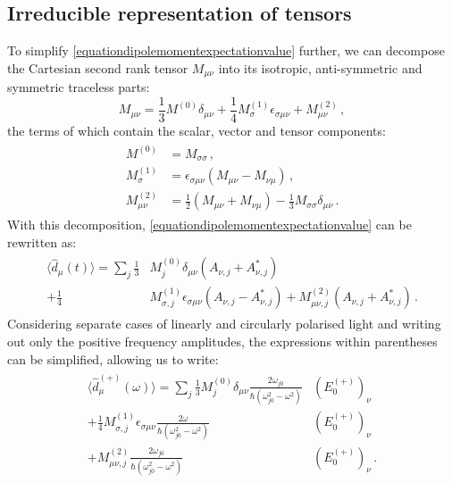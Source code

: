 \documentclass[../Thesis-IJspeert.tex]{subfiles}
\begin{document}
\subsection{Irreducible representation of tensors}
To simplify \autoref{equationdipolemomentexpectationvalue} further, we can decompose the Cartesian second rank tensor $M_{\mu\nu}$ into its isotropic, anti-symmetric and symmetric traceless parts:
\begin{equation}
\label{irreduciblerepcartesian}
	M_{\mu\nu}=\frac{1}{3}M^{(0)}\delta_{\mu\nu} + \frac{1}{4}M_{\sigma}^{(1)}\epsilon_{\sigma\mu\nu} + M_{\mu\nu}^{(2)} \,,
\end{equation}
the terms of which contain the scalar, vector and tensor components:
\begin{align}
\begin{split}
 M^{(0)} &= M_{\sigma\sigma} \,,\\
 M^{(1)}_\sigma &= \epsilon_{\sigma\mu\nu}(M_{\mu\nu}-M_{\nu\mu}) \,,\\
 M^{(2)}_{\mu\nu} &= \frac{1}{2}(M_{\mu\nu}+M_{\nu\mu}) - \frac{1}{3}M_{\sigma\sigma}\delta_{\mu\nu} \,.
\end{split}
\end{align}
With this decomposition, \autoref{equationdipolemomentexpectationvalue} can be rewritten as:
\begin{align}
\begin{split}
\langle \hat{d}_\mu (t) \rangle = \sum_j \frac{1}{3}&M^{(0)}_j \delta_{\mu\nu} \left(A_{\nu,j}+A_{\nu,j}^*\right) \\+ \frac{1}{4} &M^{(1)}_{\sigma,j} \epsilon_{\sigma\mu\nu} \left( A_{\nu,j} - A_{\nu,j}^* \right) + M^{(2)}_{\mu\nu,j} \left( A_{\nu,j}+A_{\nu,j}^*\right) \,.
\end{split}
\end{align}
Considering separate cases of linearly and circularly polarised light and writing out only the positive frequency amplitudes, the expressions within parentheses can be simplified, allowing us to write:
\begin{align}
\label{dipolemomentintermsofirreduciblerep}
\begin{split}
\langle \hat{d}^{(+)}_\mu (\omega) \rangle = \sum_j \frac{1}{3} M^{(0)}_j \delta_{\mu\nu} \frac{2\omega_{j0} }{\hbar (\omega_{j0}^2-\omega^2)} &( E_0^{(+)} )_\nu \\+ \frac{1}{4} M^{(1)}_{\sigma,j} \epsilon_{\sigma\mu\nu} \frac{2\omega }{\hbar (\omega_{j0}^2-\omega^2)} &( E_0^{(+)} )_\nu \\+ M^{(2)}_{\mu\nu,j} \frac{2\omega_{j0} }{\hbar (\omega_{j0}^2-\omega^2)} &( E_0^{(+)} )_\nu \,.
\end{split}
\end{align}
\end{document}
